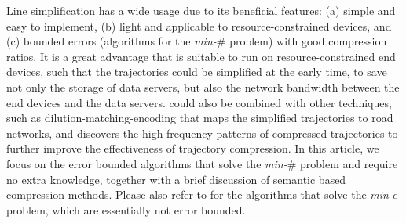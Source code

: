 %
Line simplification has a wide usage due to its beneficial features: (a) simple and easy to implement, {(b) light and applicable to resource-constrained devices}, and (c) bounded errors (algorithms for the \emph{min-$\#$} problem) with good compression ratios.
%
{It is a great advantage that \lsa is suitable to run on resource-constrained end devices, such that the trajectories could be simplified at the early time, to save not only the storage of data servers, but also the network bandwidth between the end devices and the data servers. \lsa could also be combined with other techniques, such as dilution-matching-encoding \cite{Gotsman:Compaction} that maps the simplified trajectories to road networks, and discovers the high frequency patterns of compressed trajectories to further improve the effectiveness of trajectory compression.}
%
{In this article, we focus on the error bounded \lsa algorithms that solve the \emph{min-$\#$} problem and require no extra knowledge, together with a brief discussion of semantic based  compression methods.  Please also refer to \cite{Muckell:SQUISH,Muckell:Compression,Zhang:Evaluation} for the algorithms that solve the \emph{min-$\epsilon$} problem, which are essentially not error bounded.}
%
%

